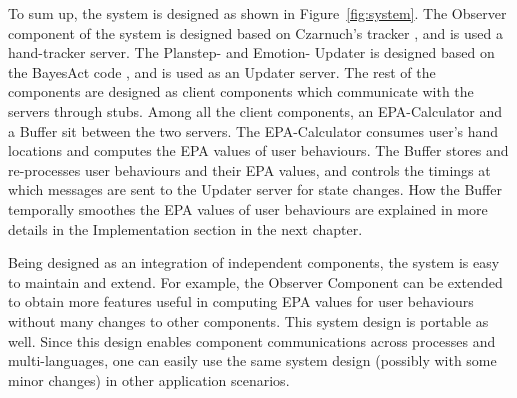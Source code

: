 To sum up, the system is designed as shown in Figure~\ref{fig:system}. The Observer component of the system is designed based on Czarnuch's tracker \cite{czarnuch2014}, and is used a hand-tracker server. The Planstep- and Emotion- Updater is designed based on the BayesAct code \cite{hoey2013bayesian}, and is used as an Updater server. The rest of the components are designed as client components which communicate with the servers through stubs. Among all the client components, an EPA-Calculator and a Buffer sit between the two servers. The EPA-Calculator consumes user's hand locations and computes the EPA values of user behaviours. The Buffer stores and re-processes user behaviours and their EPA values, and controls the timings at which messages are sent to the Updater server for state changes. How the Buffer temporally smoothes the EPA values of user behaviours are explained in more details in the Implementation section in the next chapter.

Being designed as an integration of independent components, the system is easy to maintain and extend. For example, the Observer Component can be extended to obtain more features useful in computing EPA values for user behaviours without many changes to other components. This system design is portable as well. Since this design enables component communications across processes and multi-languages, one can easily use the same system design (possibly with some minor changes) in other application scenarios.
